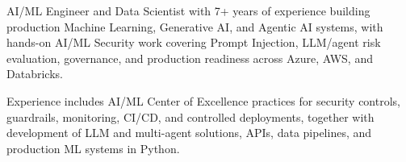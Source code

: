 
{\small\color{cvtext}%
\noindent AI/ML Engineer and Data Scientist with 7+ years of experience building production Machine Learning, Generative AI, and Agentic AI systems, with hands-on AI/ML Security work covering Prompt Injection, LLM/agent risk evaluation, governance, and production readiness across Azure, AWS, and Databricks.\par
\vspace{0.14em}%
\noindent Experience includes AI/ML Center of Excellence practices for security controls, guardrails, monitoring, CI/CD, and controlled deployments, together with development of LLM and multi-agent solutions, APIs, data pipelines, and production ML systems in Python.\par
}
